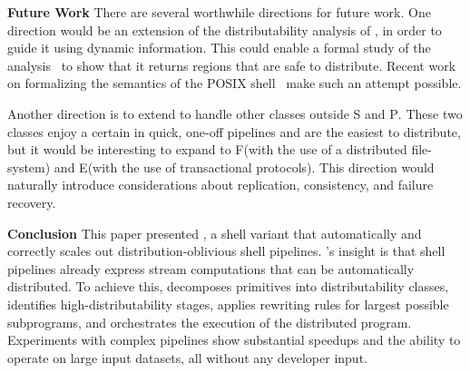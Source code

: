 \documentclass[sigplan,10pt,review,anonymous]{acmart}
\newcommand{\heading}[1]{\vspace{4pt}\noindent\textbf{#1}\enspace}
\newcommand{\cn}[1]{\mbox{\textcircled{\footnotesize #1}}}
\newcommand{\pur}{\cn{\textsc{P}}\xspace}
\newcommand{\sta}{\cn{\textsc{S}}\xspace}
\newcommand{\dfs}{\cn{\textsc{F}}\xspace}
\newcommand{\sid}{\cn{\textsc{E}}\xspace}
\newcommand{\kk}[1]{[{\color{magenta}#1 --- kk}]}
\begin{document}
\heading{Future Work}
There are several worthwhile directions for future work.  One
direction would be an extension of the distributability analysis of
\sys, in order to guide it using dynamic information. This could
enable a formal study of the analysis~ to show that it
returns regions that are safe to distribute.  Recent work on
formalizing the semantics of the POSIX shell~\cite{smoosh:20} make
such an attempt possible.

Another direction is to extend \sys to handle other classes outside \sta and \pur.
These two classes enjoy a certain in quick, one-off pipelines and are the easiest to distribute, but 
it would be interesting to expand to \dfs (with the use of a distributed file-system) and \sid (with the use of transactional protocols).
This direction would naturally introduce considerations about replication, consistency, and failure recovery.


\heading{Conclusion}
This paper presented \sys, a shell variant that automatically and correctly scales out distribution-oblivious shell pipelines. 
\sys's insight is that shell pipelines already express stream computations that can be automatically distributed.
To achieve this, \sys
  decomposes primitives into distributability classes,
  identifies high-distributability stages,
  applies rewriting rules for largest possible subprograms,
  and orchestrates the execution of the distributed program.
Experiments with complex pipelines show substantial speedups and the ability to operate on large input datasets, all without any developer input.
\end{document}
